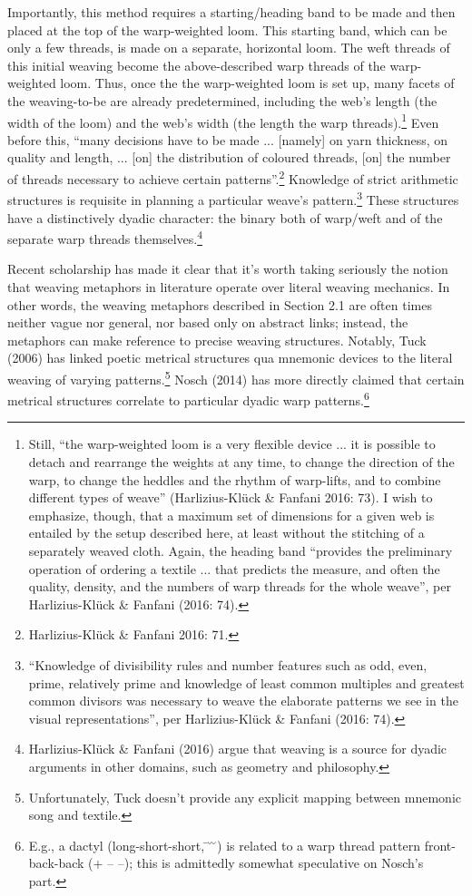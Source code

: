 \documentclass[12pt]{article}
\begin{document}
Importantly, this method requires a starting/heading band to be made and then placed at the top of the warp-weighted loom. This starting band, which can be only a few threads, is made on a separate, horizontal loom. The weft threads of this initial weaving become the above-described warp threads of the warp-weighted loom. Thus, once the the warp-weighted loom is set up, many facets of the weaving-to-be are already predetermined, including the web's length (the width of the loom) and the web's width (the length the warp threads).\footnote{ Still, ``the warp-weighted loom is a very flexible device ... it is possible to detach and rearrange the weights at any time, to change the direction of the warp, to change the heddles and the rhythm of warp-lifts, and to combine different types of weave'' (Harlizius-Kl\"{u}ck \& Fanfani 2016: 73). I wish to emphasize, though, that a maximum set of dimensions for a given web is entailed by the setup described here, at least without the stitching of a separately weaved cloth. Again, the heading band ``provides the preliminary operation of ordering a textile ... that predicts the measure, and often the quality, density, and the numbers of warp threads for the whole weave'', per Harlizius-Kl\"{u}ck \& Fanfani (2016: 74). } Even before this, ``many decisions have to be made ... [namely] on yarn thickness, on quality and length, ... [on] the distribution of coloured threads, [on] the number of threads necessary to achieve certain patterns''.\footnote{ Harlizius-Kl\"{u}ck \& Fanfani 2016: 71.} Knowledge of strict arithmetic structures is requisite in planning a particular weave's pattern.\footnote{ ``Knowledge of divisibility rules and number features such as odd, even, prime, relatively prime and knowledge of least common multiples and greatest common divisors was necessary to weave the elaborate patterns we see in the visual representations'', per Harlizius-Kl\"{u}ck \& Fanfani (2016: 74).} These structures have a distinctively dyadic character: the binary both of warp/weft and of the separate warp threads themselves.\footnote{ Harlizius-Kl\"{u}ck \& Fanfani (2016) argue that weaving is a source for dyadic arguments in other domains, such as geometry and philosophy.}
 
Recent scholarship has made it clear that it's worth taking seriously the notion that weaving metaphors in literature operate over literal weaving mechanics. In other words, the weaving metaphors described in Section 2.1 are often times neither vague nor general, nor based only on abstract links; instead, the metaphors can make reference to precise weaving structures. Notably, Tuck (2006) has linked poetic metrical structures qua mnemonic devices to the literal weaving of varying patterns.\footnote{ Unfortunately, Tuck doesn't provide any explicit mapping between mnemonic song and textile.} Nosch (2014) has more directly claimed that certain metrical structures correlate to particular dyadic warp patterns.\footnote{ E.g., a dactyl (long-short-short, \={} \u{} \u{}) is related to a warp thread pattern front-back-back (+ -- --); this is admittedly somewhat speculative on Nosch's part.} 
\end{document}
